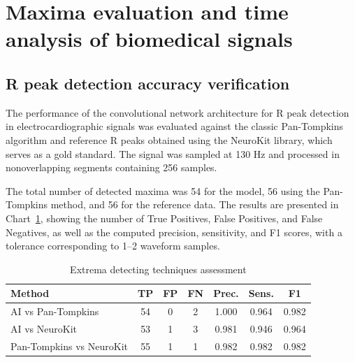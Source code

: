 \documentclass{citask}
\begin{document}
\section{Maxima evaluation and time analysis of biomedical signals}
\subsection{R peak detection accuracy verification}
The performance of the convolutional network architecture for R peak detection in electrocardiographic signals was evaluated against the classic Pan-Tompkins algorithm and reference R peaks obtained using the NeuroKit library, which serves as a gold standard. The signal was sampled at 130 Hz and processed in nonoverlapping segments containing 256 samples.

The total number of detected maxima was 54 for the model, 56 using the Pan-Tompkins method, and 56 for the reference data. The results are presented in Chart~\ref{tab:peak_comparison}, showing the number of True Positives, False Positives, and False Negatives, as well as the computed precision, sensitivity, and F1 scores, with a tolerance corresponding to 1–2 waveform samples.

\begin{table}[ht]
\caption{Extrema detecting techniques assessment}
\label{tab:peak_comparison}
\centering
\begin{tabular}{|p{3.08cm}|c|c|c|c|c|c|}
\hline
\textbf{Method} & \textbf{TP} & \textbf{FP} & \textbf{FN} & \textbf{Prec.} & \textbf{Sens.} & \textbf{F1} \\
\hline
AI vs Pan-Tompkins & 54 & 0 & 2 & 1.000 & 0.964 & 0.982 \\
AI vs NeuroKit & 53 & 1 & 3 & 0.981 & 0.946 & 0.964 \\
Pan-Tompkins vs NeuroKit & 55 & 1 & 1 & 0.982 & 0.982 & 0.982 \\
\hline
\end{tabular}
\end{table}
\end{document}
